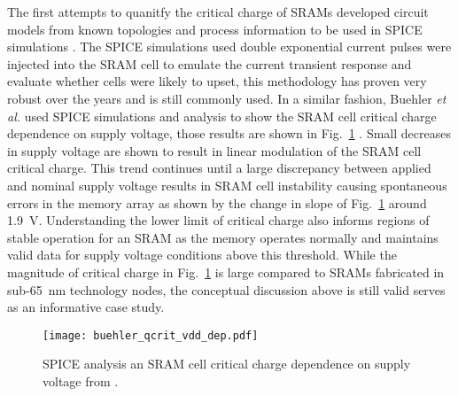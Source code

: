 The first attempts to quanitfy the critical charge of SRAMs developed circuit models from known topologies and process information to be used in SPICE simulations \cite{buehler1990alpha,roth1993monitoring}.
The SPICE simulations used double exponential current pulses were injected into the SRAM cell to emulate the current transient response and evaluate whether cells were likely to upset, this methodology has proven very robust over the years and is still commonly used.
In a similar fashion, Buehler \emph{et al.} used SPICE simulations and analysis to show the SRAM cell critical charge dependence on supply voltage, those results are shown in Fig.~\ref{fig:qcrit_vdd_dep} \cite{buehler1990alpha}.
Small decreases in supply voltage are shown to result in linear modulation of the SRAM cell critical charge.
This trend continues until a large discrepancy between applied and nominal supply voltage results in SRAM cell instability causing spontaneous errors in the memory array as shown by the change in slope of Fig.~\ref{fig:qcrit_vdd_dep} around 1.9~V.
Understanding the lower limit of critical charge also informs regions of stable operation for an SRAM as the memory operates normally and maintains valid data for supply voltage conditions above this threshold.
While the magnitude of critical charge in Fig.~\ref{fig:qcrit_vdd_dep} is large compared to SRAMs fabricated in sub-65~nm technology nodes, the conceptual discussion above is still valid serves as an informative case study.
\begin{figure}[tb]
    \begin{center}
        \texttt{[image: buehler\_qcrit\_vdd\_dep.pdf]}
    \end{center}
    \caption[SPICE analysis of the critical charge dependence on supply voltage]
    {SPICE analysis an SRAM cell critical charge dependence on supply voltage from \cite{buehler1990alpha}.}
    \label{fig:qcrit_vdd_dep}
\end{figure}

